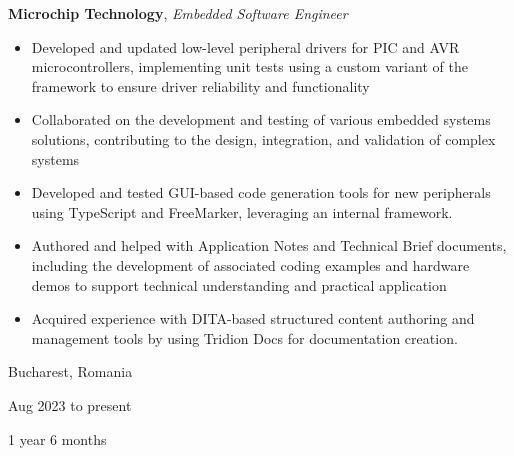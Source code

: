 \documentclass[10pt, letterpaper]{article}
\newenvironment{highlights}{
    \begin{itemize}[
        topsep=0.1 cm,
        parsep=0.1 cm,
        partopsep=0pt,
        itemsep=0pt,
        leftmargin=0 cm + 10pt
    ]
}{
    \end{itemize}
} %
\newenvironment{twocolentry}[2][]{
    \onecolentry
    \def\secondColumn{#2}
    \setcolumnwidth{\fill, 3.5 cm}
    \begin{paracol}{2}
}{
    \switchcolumn \raggedleft \secondColumn
    \end{paracol}
    \endonecolentry
} %
\let\hrefWithoutArrow\href
\renewcommand{\href}[2]{\hrefWithoutArrow{#1}{\ifthenelse{\equal{#2}{}}{ }{#2 }\raisebox{.15ex}{\footnotesize \faExternalLink*}}}
\begin{document}
        
        \begin{twocolentry}{
            Bucharest, Romania

        Aug 2023 to present

        1 year 6 months
        }
            \textbf{Microchip Technology}, \textit{Embedded Software Engineer}
            \begin{highlights}
                \item Developed and updated low-level peripheral drivers for PIC and AVR microcontrollers, implementing unit tests using a custom variant of the \href{https://www.throwtheswitch.org/unity}{Unity} framework to ensure driver reliability and functionality
                \item Collaborated on the development and testing of various embedded systems solutions, contributing to the design, integration, and validation of complex systems
                \item Developed and tested GUI-based code generation tools for new peripherals using TypeScript and FreeMarker, leveraging an internal framework.
                \item Authored and helped with Application Notes and Technical Brief documents, including the development of associated coding examples and hardware demos to support technical understanding and practical application
                \item Acquired experience with DITA-based structured content authoring and management tools by using Tridion Docs for documentation creation.
            \end{highlights}
        \end{twocolentry}


        \vspace{0.2 cm}
\end{document}
